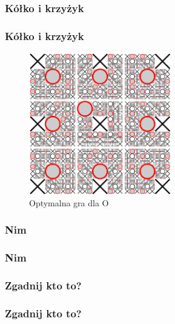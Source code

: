 \documentclass[polish,envcountsect,10pt]{beamer}
\begin{document}
        \subsubsection{Kółko i krzyżyk}
            \begin{frame}
                \frametitle{Kółko i krzyżyk}
                \begin{figure}[H]
                    \centering
                    \includegraphics[width=0.55\textwidth,natwidth=480,natheight=480]{images/480px-Tictactoe-O.svg.png}
                    \caption{Optymalna gra dla O}
                \end{figure}
            \end{frame}
        \subsubsection{Nim}
            \begin{frame}
                \frametitle{Nim}                
            \end{frame}
        \subsubsection{Zgadnij kto to?}
            \begin{frame}
                \frametitle{Zgadnij kto to?}
            \end{frame}
\end{document}
